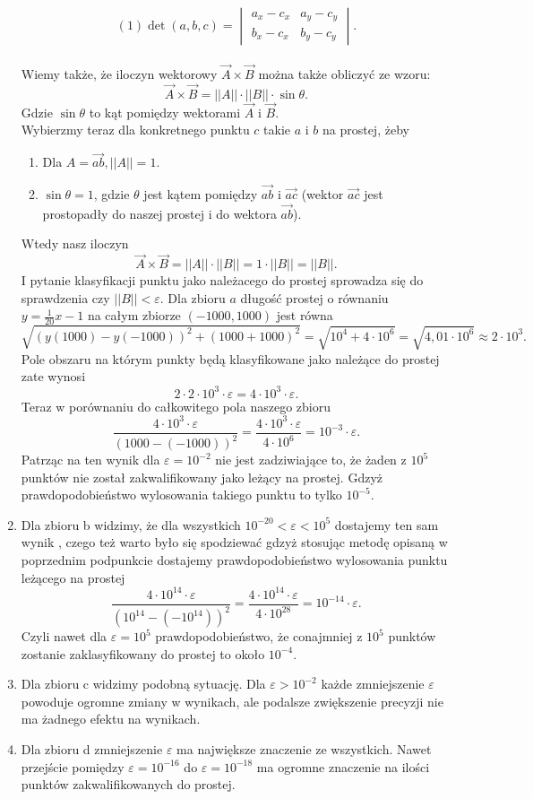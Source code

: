 \begin{enumerate}
$$
(1)\det(a, b, c)= \begin{vmatrix}
       a_{x} - c_{x} & a_{y} - c_{y} \\
       b_{x} - c_{x} & b_{y} - c_{y} 
              \end{vmatrix}.
$$\\
Wiemy także, że iloczyn wektorowy $\overrightarrow{A} \times \overrightarrow{B}$ można także obliczyć ze wzoru: 
$$
\overrightarrow{A} \times \overrightarrow{B} = ||A|| \cdot ||B|| \cdot \sin{\theta}.
$$
Gdzie $\sin{\theta}$ to kąt pomiędzy wektorami $\overrightarrow{A}$ i $\overrightarrow{B}$.\\
Wybierzmy teraz dla konkretnego punktu $c$ takie $a$ i $b$ na prostej, żeby 
\begin{enumerate}
    \item Dla $A = \overrightarrow{ab}, ||{A}|| = 1$.
    \item $\sin{\theta} = 1$, gdzie $\theta$ jest kątem pomiędzy $\overrightarrow{ab}$ i $\overrightarrow{ac}$ (wektor $\overrightarrow{ac}$ jest prostopadły do naszej prostej i do wektora $\overrightarrow{ab}$).
\end{enumerate}
Wtedy nasz iloczyn $$\overrightarrow{A} \times \overrightarrow{B} = ||A|| \cdot ||B|| = 1 \cdot ||B|| = ||B||.$$
I pytanie klasyfikacji punktu jako należacego do prostej sprowadza się do sprawdzenia czy $||B|| < \varepsilon$.
Dla zbioru $a$ długość prostej o równaniu $y = \frac{1}{20}x - 1$ na całym zbiorze $(-1000, 1000)$ jest równa 
$$
    \sqrt{(y(1000) - y(-1000))^2 + (1000 + 1000)^2} = \sqrt{10 ^ 4 + 4 \cdot 10^6} = \sqrt{4,01 \cdot 10^6} \approx 2 \cdot 10^3.
$$
Pole obszaru na którym punkty będą klasyfikowane jako należące do prostej zate wynosi
$$
    2 \cdot 2 \cdot 10^3 \cdot \varepsilon = 4 \cdot 10^3 \cdot \varepsilon.
$$
Teraz w porównaniu do całkowitego pola naszego zbioru
$$
    \frac{4 \cdot 10^3 \cdot \varepsilon}{(1000 - (-1000))^2}=
    \frac{4 \cdot 10^3 \cdot \varepsilon}{4 \cdot 10^6} =  10^{-3} \cdot \varepsilon.
$$
Patrząc na ten wynik dla $\varepsilon = 10^{-2}$ nie jest zadziwiające to, że 
żaden z $10^5$ punktów nie został zakwalifikowany jako leżący na prostej. Gdzyż prawdopodobieństwo 
wylosowania takiego punktu to tylko $10^{-5}$.
\item Dla zbioru b widzimy, że dla wszystkich $10^{-20} < \varepsilon < 10^5$ dostajemy ten sam wynik 
, czego też warto było się spodziewać gdzyż stosując metodę opisaną w poprzednim podpunkcie dostajemy 
prawdopodobieństwo wylosowania punktu leżącego na prostej 
$$
    \frac{4 \cdot 10^{14} \cdot \varepsilon}{(10^{14} - (-10^{14}))^2}=
    \frac{4 \cdot 10^{14} \cdot \varepsilon}{4 \cdot 10^{28}} =  10^{-14} \cdot \varepsilon.
$$
Czyli nawet dla $\varepsilon = 10^5$ prawdopodobieństwo, że conajmniej z $10^5$ punktów zostanie zaklasyfikowany 
do prostej to około $10^{-4}$.
\item Dla zbioru c widzimy podobną sytuację. Dla $\varepsilon > 10^{-2}$ 
każde zmniejszenie $\varepsilon$ powoduje ogromne zmiany w wynikach, ale podalsze zwiększenie precyzji 
nie ma żadnego efektu na wynikach.

\item Dla zbioru d zmniejszenie $\varepsilon$ ma największe znaczenie ze wszystkich. 
Nawet przejście pomiędzy $\varepsilon = 10^{-16}$ do $\varepsilon = 10^{-18}$ ma ogromne znaczenie 
na ilości punktów zakwalifikowanych do prostej.
\end{enumerate}